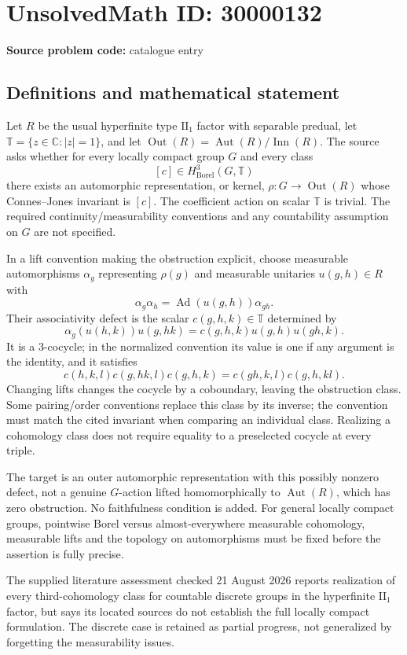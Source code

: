 \documentclass[11pt]{article}
\newcommand{\C}{\mathbb{C}}
\begin{document}
\section*{UnsolvedMath ID: 30000132}
\textbf{Source problem code:} catalogue entry
\subsection{Definitions and mathematical statement}
Let $R$ be the usual hyperfinite type $\mathrm{II}_1$ factor with separable predual, let $\mathbb T=\{z\in\C:|z|=1\}$, and let $\operatorname{Out}(R)=\operatorname{Aut}(R)/\operatorname{Inn}(R)$. The source asks whether for every locally compact group $G$ and every class
\[
 [c]\in H^3_{\mathrm{Borel}}(G,\mathbb T)
\]
there exists an automorphic representation, or kernel, $\rho:G\to\operatorname{Out}(R)$ whose Connes--Jones invariant is $[c]$. The coefficient action on scalar $\mathbb T$ is trivial. The required continuity/measurability conventions and any countability assumption on $G$ are not specified.

In a lift convention making the obstruction explicit, choose measurable automorphisms $\alpha_g$ representing $\rho(g)$ and measurable unitaries $u(g,h)\in R$ with
\[
 \alpha_g\alpha_h=\operatorname{Ad}(u(g,h))\alpha_{gh}.
\]
Their associativity defect is the scalar $c(g,h,k)\in\mathbb T$ determined by
\[
 \alpha_g(u(h,k))u(g,hk)
 =c(g,h,k)u(g,h)u(gh,k).
\]
It is a $3$-cocycle; in the normalized convention its value is one if any argument is the identity, and it satisfies
\[
 c(h,k,l)c(g,hk,l)c(g,h,k)
 =c(gh,k,l)c(g,h,kl).
\]
Changing lifts changes the cocycle by a coboundary, leaving the obstruction class. Some pairing/order conventions replace this class by its inverse; the convention must match the cited invariant when comparing an individual class. Realizing a cohomology class does not require equality to a preselected cocycle at every triple.

The target is an outer automorphic representation with this possibly nonzero defect, not a genuine $G$-action lifted homomorphically to $\operatorname{Aut}(R)$, which has zero obstruction. No faithfulness condition is added. For general locally compact groups, pointwise Borel versus almost-everywhere measurable cohomology, measurable lifts and the topology on automorphisms must be fixed before the assertion is fully precise.

The supplied literature assessment checked 21 August 2026 reports realization of every third-cohomology class for countable discrete groups in the hyperfinite $\mathrm{II}_1$ factor, but says its located sources do not establish the full locally compact formulation. The discrete case is retained as partial progress, not generalized by forgetting the measurability issues.
\end{document}
